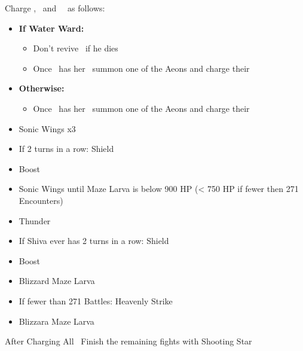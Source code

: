 \begin{encounters}
	Charge \yuna, \valefor\ and \shiva\ \od\ as follows:
	\vspace{\baselineskip}
	\begin{itemize}
		\yunaf
		\begin{itemize}
			\item \textbf{If Water Ward:}
				\begin{itemize}
					\yunaf Hi-Potion Self if damaged, otherwise defend
					\auronf Defend Always
					\item Don't revive \auron\ if he dies
					\item Once \yuna\ has her \od\ summon one of the Aeons and charge their \od\
				\end{itemize}
			\item \textbf{Otherwise:}
				\begin{itemize}
					\yunaf Defend
					\auronf Phoenix Down \yuna, or Hi-Potion Self
					\item Once \yuna\ has her \od\ summon one of the Aeons and charge their \od\
				\end{itemize}
		\end{itemize}
		\valeforf
		\begin{itemize}
			\item Sonic Wings x3
			\item If 2 turns in a row: Shield
			\item Boost
			\item Sonic Wings until Maze Larva is below 900 HP (< 750 HP if fewer then 271 Encounters)
			\item Thunder
		\end{itemize}
		\shivaf
		\begin{itemize}
			\item If Shiva ever has 2 turns in a row: Shield
			\item Boost
			\item Blizzard Maze Larva
			\item If fewer than 271 Battles: Heavenly Strike
			\item Blizzara Maze Larva
		\end{itemize}
	\end{itemize}
	\vspace{\baselineskip}
	After Charging All \od\ Finish the remaining fights with Shooting Star
\end{encounters}
